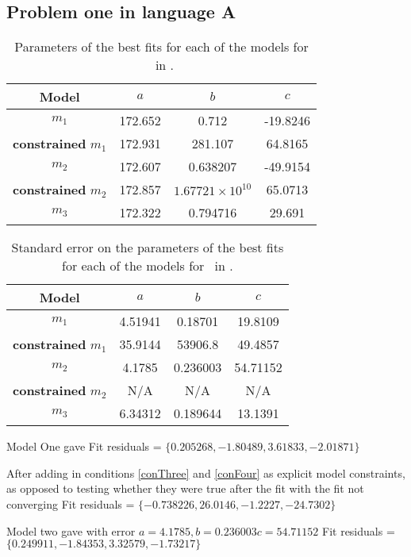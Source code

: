 \subsection{Problem one in language A} \label{subsecP1LA}

\begin{table}
\centering
\begin{tabular}{|c|c|c|c|}
\hline
{\bf Model} &  $a$ & $b$ & $c$ \\
\hline
$m_1$ & 172.652 & 0.712 & -19.8246 \\
\hline
{\bf constrained} $m_1$ & 172.931 & 281.107 & 64.8165 \\
\hline
$m_2$ & 172.607 & 0.638207 & -49.9154\\
\hline
{\bf constrained} $m_2$ & 172.857 & $1.67721 \times 10^10$ & 65.0713 \\
\hline
$m_3$ & 172.322 & 0.794716 & 29.691 \\
\hline
\end{tabular}
\caption{Parameters of the best fits for each of the models for \PO\ in \LA.}
\label{table:P1LA:abc}
\end{table}

\begin{table}
\centering
\begin{tabular}{|c|c|c|c|}
\hline
{\bf Model} &  $a$ & $b$ & $c$ \\
\hline
$m_1$ & 4.51941 & 0.18701 & 19.8109 \\
\hline
{\bf constrained} $m_1$ & 35.9144 & 53906.8 & 49.4857 \\
\hline
$m_2$ & 4.1785 & 0.236003 & 54.71152\\
\hline
{\bf constrained} $m_2$ & N/A & N/A & N/A \\
\hline
$m_3$ & 6.34312 & 0.189644 & 13.1391 \\
\hline
\end{tabular}
\caption{Standard error on the parameters of the best fits for each of the models for \PO\ in \LA.}
\label{table:P1LA:abc:error}
\end{table}

Model One gave
Fit residuals = $\{0.205268, -1.80489, 3.61833, -2.01871\}$

After adding in conditions \ref{conThree} and \ref{conFour} as explicit model
constraints, as opposed to testing whether they were true after the fit
with the fit not converging
Fit residuals = $\{-0.738226, 26.0146, -1.2227, -24.7302\}$

Model two gave
with error $a = 4.1785, b = 0.236003 c = 54.71152$
Fit residuals = $\{0.249911, -1.84353, 3.32579, -1.73217\}$

